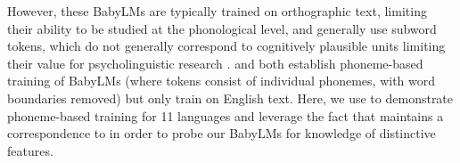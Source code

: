 
However, these BabyLMs are typically trained on orthographic text, limiting their ability to be studied at the phonological level, and generally use subword tokens, which do not generally correspond to cognitively plausible units \citep{beinborn-pinter-2023-analyzing} limiting their value for psycholinguistic research \citep{giulianelli-etal-2024-proper}. \citet{bunzeck2024graphemes} and \citet{goriely2024babble} both establish phoneme-based training of BabyLMs (where tokens consist of individual phonemes, with word boundaries removed) but only train on English text. Here, we use \ipachildes to demonstrate phoneme-based training for 11 languages and leverage the fact that \corpusphonemizer maintains a correspondence to \phoible in order to probe our BabyLMs for knowledge of distinctive features. 


